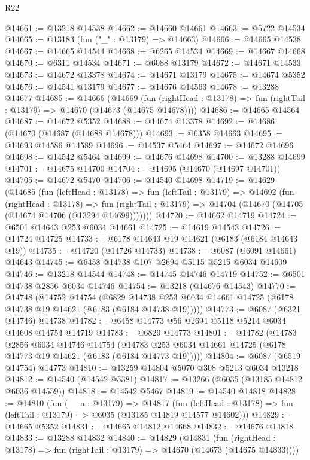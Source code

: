 \begin{lexlean}{R22}
\begin{coremodule}
@14661 := @13218 @14538
@14662 := @14660 @14661
@14663 := @5722 @14534
@14665 := @13183 (fun ("_" : @13179) => @14663)
@14666 := @14665 @14538
@14667 := @14665 @14544
@14668 := @6265 @14534
@14669 := @14667 @14668
@14670 := @6311 @14534
@14671 := @6088 @13179
@14672 := @14671 @14533
@14673 := @14672 @13378
@14674 := @14671 @13179
@14675 := @14674 @5352
@14676 := @14541 @13179
@14677 := @14676 @14563
@14678 := @13288 @14677
@14685 := @14666
    (@14669
      (fun (rightHead : @13178) => fun (rightTail : @13179) => @14670 (@14673 (@14675 @14678))))
@14686 := @14665 @14564
@14687 := @14672 @5352
@14688 := @14674 @13378
@14692 := @14686 (@14670 (@14687 (@14688 @14678)))
@14693 := @6358 @14663
@14695 := @14693 @14586 @14589
@14696 := @14537 @5464
@14697 := @14672 @14696
@14698 := @14542 @5464
@14699 := @14676 @14698
@14700 := @13288 @14699
@14701 := @14675 @14700
@14704 := @14695 (@14670 (@14697 @14701))
@14705 := @14672 @5470
@14706 := @14540 @14698
@14719 := @14629
    (@14685
      (fun (leftHead : @13178) =>
      fun (leftTail : @13179) =>
      @14692
        (fun (rightHead : @13178) =>
        fun (rightTail : @13179) => @14704 (@14670 (@14705 (@14674 @14706 (@13294 @14699)))))))
@14720 := @14662 @14719
@14724 := @6501 @14643 @253 @6034 @14661
@14725 := @14619 @14543
@14726 := @14724 @14725
@14733 := @6178 @14643 @19 @14621 (@6183 (@6184 @14643 @19))
@14735 := @14720 (@14726 @14733)
@14738 := @6087 (@6091 @14661) @14643
@14745 := @6458 @14738 @107 @2694 @5115 @5215 @6034 @14609
@14746 := @13218 @14544
@14748 := @14745 @14746 @14719
@14752 := @6501 @14738 @2856 @6034 @14746
@14754 := @13218 (@14676 @14543)
@14770 := @14748
    (@14752
      @14754
      (@6829 @14738 @253 @6034 @14661 @14725 (@6178 @14738 @19 @14621 (@6183 (@6184 @14738 @19)))))
@14773 := @6087 (@6321 @14746) @14738
@14782 := @6458 @14773 @56 @2694 @5118 @5214 @6034 @14608 @14754 @14719
@14783 := @6829 @14773
@14801 := @14782
    (@14783
      @2856
      @6034
      @14746
      @14754
      (@14783 @253 @6034 @14661 @14725 (@6178 @14773 @19 @14621 (@6183 (@6184 @14773 @19)))))
@14804 := @6087 (@6519 @14754) @14773
@14810 := @13259 @14804 @5070 @308 @5213 @6034 @13218
@14812 := @14540 (@14542 @5381)
@14817 := @13266 (@6035 (@13185 @14812 @6036 @14559))
@14818 := @14542 @5467
@14819 := @14540 @14818
@14828 := @14810
    (fun (__a : @13179) =>
    @14817
      (fun (leftHead : @13178) => fun (leftTail : @13179) => @6035 (@13185 @14819 @14577 @14602)))
@14829 := @14665 @5352
@14831 := @14665 @14812 @14668
@14832 := @14676 @14818
@14833 := @13288 @14832
@14840 := @14829
    (@14831
      (fun (rightHead : @13178) => fun (rightTail : @13179) => @14670 (@14673 (@14675 @14833))))

\end{coremodule}
\end{lexlean}

